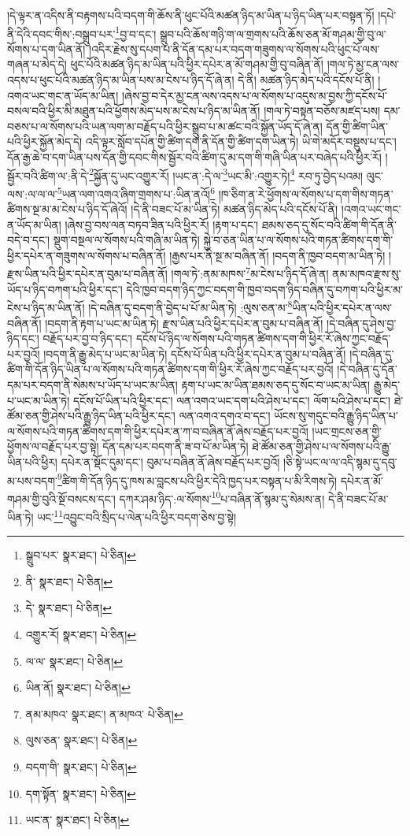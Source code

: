 །དེ་ལྟར་ན་འདིས་ནི་བརྟགས་པའི་བདག་གི་ཆོས་ནི་ཕུང་པོའི་མཚན་ཉིད་མ་ཡིན་པ་ཉིད་ཡིན་པར་བསྟན་ཏོ། །དཔེ་ནི་དེའི་དབང་གིས་:བསྒྲུབ་པར་\footnote{སྒྲུབ་པར་  སྣར་ཐང་།  པེ་ཅིན། }བྱ་བ་དང་། སྒྲུབ་པའི་ཆོས་གཉི་ག་ལ་གྲགས་པའི་ཆོས་ཅན་མོ་གཤམ་གྱི་བུ་ལ་སོགས་པ་དག་ཡིན་ནོ། །འདིར་རྗེས་སུ་དཔག་པ་ནི་དོན་དམ་པར་བདག་གཟུགས་ལ་སོགས་པའི་ཕུང་པོ་ལས་གཞན་པ་མེད་དེ། ཕུང་པོའི་མཚན་ཉིད་མ་ཡིན་པའི་ཕྱིར་དཔེར་ན་མོ་གཤམ་གྱི་བུ་བཞིན་ནོ། །གལ་ཏེ་མྱ་ངན་ལས་འདས་པ་ཕུང་པོའི་མཚན་ཉིད་མ་ཡིན་པས་མ་ངེས་པ་ཉིད་དོ་ཞེ་ན། དེ་ནི། མཚན་ཉིད་མེད་པའི་དངོས་པོ་ནི། །འགའ་ཡང་གང་ན་ཡོད་མ་ཡིན། །ཞེས་བྱ་བ་དེར་མྱ་ངན་ལས་འདས་པ་ལ་སོགས་པ་འདུས་མ་བྱས་ཀྱི་དངོས་པོ་བསལ་བའི་ཕྱིར་མི་མཐུན་པའི་ཕྱོགས་མེད་པས་མ་ངེས་པ་ཉིད་མ་ཡིན་ནོ། །གལ་ཏེ་བསྟན་བཅོས་མཛད་པས། དམ་བཅས་པ་ལ་སོགས་པའི་ཡན་ལག་མ་བརྗོད་པའི་ཕྱིར་སྒྲུབ་པ་མ་ཚང་བའི་སྐྱོན་ཡོད་དོ་ཞེ་ན། དོན་གྱི་ཚིག་ཡིན་པའི་ཕྱིར་སྐྱོན་མེད་དེ། འདི་ལྟར་སློབ་དཔོན་གྱི་ཚིག་དག་ནི་དོན་གྱི་ཚིག་དག་ཡིན་ཏེ། ཡི་གེ་མདོར་བསྡུས་པ་དང་། དོན་རྒྱ་ཆེ་བ་དག་ཡིན་པས་དོན་གྱི་དབང་གིས་སྦྱོར་བའི་ཚིག་དུ་མ་དག་གི་གཞི་ཡིན་པར་བཞེད་པའི་ཕྱིར་རོ། །སྦྱོར་བའི་ཚིག་ལ་:ནི་དེ་\footnote{ནི་  སྣར་ཐང་།  པེ་ཅིན། }སྐྱོན་དུ་ཡང་འགྱུར་རོ། །ཡང་ན་:དེ་ལ་\footnote{དེ་  སྣར་ཐང་།  པེ་ཅིན། }ཡང་མི་:འགྱུར་ཏེ།\footnote{འགྱུར་རོ།  སྣར་ཐང་།  པེ་ཅིན། } རབ་ཏུ་བྱེད་པའམ། ལུང་ལས་:ལ་ལ་ལ་\footnote{ལ་ལ་  སྣར་ཐང་།  པེ་ཅིན། }ཡན་ལག་འགའ་ཞིག་གྲགས་པ་:ཡིན་ནའོ།\footnote{ཡིན་ནོ།  སྣར་ཐང་།  པེ་ཅིན། } །ཁ་ཅིག་ན་རེ་ཕྱོགས་ལ་སོགས་པ་དག་གིས་གཏན་ཚིགས་སྔ་མ་མ་ངེས་པ་ཉིད་དོ་ཞེའོ། །དེ་ནི་བཟང་པོ་མ་ཡིན་ཏེ། མཚན་ཉིད་མེད་པའི་དངོས་པོ་ནི། །འགའ་ཡང་གང་ན་ཡོད་མ་ཡིན། །ཞེས་བྱ་བས་ལན་བཏབ་ཟིན་པའི་ཕྱིར་རོ། །རྟག་པ་དང་། ཐམས་ཅད་དུ་སོང་བའི་ཚིག་གི་དོན་ནི་བདེ་བ་དང་། སྡུག་བསྔལ་ལ་སོགས་པའི་གཞི་མ་ཡིན་ཏེ། སྐྱེ་བ་ཅན་ཡིན་པ་ལ་སོགས་པའི་གཏན་ཚིགས་དག་གི་ཕྱིར་དཔེར་ན་གཟུགས་ལ་སོགས་པ་བཞིན་ནོ། །རྒྱས་པར་ནི་སྔ་མ་བཞིན་ནོ། །བདག་ནི་ཁྱབ་བདག་མ་ཡིན་ཏེ། །རྫས་ཡིན་པའི་ཕྱིར་དཔེར་ན་བུམ་པ་བཞིན་ནོ། །གལ་ཏེ་:ནམ་མཁས་\footnote{ནམ་མཁའ་  སྣར་ཐང་། ན་མཁའ་  པེ་ཅིན། }མ་ངེས་པ་ཉིད་དོ་ཞེ་ན། ནམ་མཁའ་རྫས་སུ་ཡོད་པ་ཉིད་བཀག་པའི་ཕྱིར་དང་། དེའི་ཁྱབ་བདག་ཉིད་ཀྱང་བདག་གི་ཁྱབ་བདག་ཉིད་བཞིན་དུ་བཀག་པའི་ཕྱིར་མ་ངེས་པ་ཉིད་མ་ཡིན་ནོ། །དེ་བཞིན་དུ་བདག་ནི་བྱེད་པ་པོ་མ་ཡིན་ཏེ། :ལུས་ཅན་མ་\footnote{ལུས་ཅན་  སྣར་ཐང་།  པེ་ཅིན། }ཡིན་པའི་ཕྱིར་དཔེར་ན་ལས་བཞིན་ནོ། །བདག་ནི་རྟག་པ་ཡང་མ་ཡིན་ཏེ། རྫས་ཡིན་པའི་ཕྱིར་དཔེར་ན་བུམ་པ་བཞིན་ནོ། །དེ་བཞིན་དུ་ཤེས་བྱ་ཉིད་དང་། བརྗོད་པར་བྱ་བ་ཉིད་དང་། དངོས་པོ་ཉིད་ལ་སོགས་པའི་གཏན་ཚིགས་དག་གི་ཕྱིར་རོ་ཞེས་ཀྱང་བརྗོད་པར་བྱའོ། །བདག་ནི་རྒྱུ་མེད་པ་ཡང་མ་ཡིན་ཏེ། དངོས་པོ་ཡིན་པའི་ཕྱིར་དཔེར་ན་བུམ་པ་བཞིན་ནོ། །དེ་བཞིན་དུ་ཚིག་གི་དོན་ཉིད་ཡིན་པ་ལ་སོགས་པའི་གཏན་ཚིགས་དག་གི་ཕྱིར་རོ་ཞེས་ཀྱང་བརྗོད་པར་བྱའོ། །དེ་བཞིན་དུ་དོན་དམ་པར་བདག་ནི་སེམས་པ་ཡོད་པ་ཡང་མ་ཡིན། རྟག་པ་ཡང་མ་ཡིན་ཐམས་ཅད་དུ་སོང་བ་ཡང་མ་ཡིན། རྒྱུ་མེད་པ་ཡང་མ་ཡིན་ཏེ། དངོས་པོ་ཡིན་པའི་ཕྱིར་དང་། ལན་འགའ་ཡང་དག་པའི་ཤེས་པ་དང་། ལོག་པའི་ཤེས་པ་དང་། ཐེ་ཚོམ་ཅན་གྱི་ཤེས་པའི་རྒྱུ་ཉིད་ཡིན་པའི་ཕྱིར་དང་། ལན་འགའ་དགའ་བ་དང་། ཡོངས་སུ་གདུང་བའི་རྒྱུ་ཉིད་ཡིན་པ་ལ་སོགས་པའི་གཏན་ཚིགས་དག་གི་ཕྱིར་དཔེར་ན་ཀ་བ་བཞིན་ནོ་ཞེས་བརྗོད་པར་བྱའོ། །ཡང་གྲངས་ཅན་གྱི་ཕྱོགས་ལ་བརྗོད་པར་བྱ་སྟེ། དོན་དམ་པར་བདག་ནི་ཟ་བ་པོ་མ་ཡིན་ཏེ། ཐེ་ཚོམ་ཅན་གྱི་ཤེས་པ་ལ་སོགས་པའི་རྒྱུ་ཡིན་པའི་ཕྱིར། དཔེར་ན་སྡོང་དུམ་དང་། བུམ་པ་བཞིན་ནོ་ཞེས་བརྗོད་པར་བྱའོ། །ཅི་སྟེ་ཡང་ལ་ལ་འདི་སྙམ་དུ་དབུ་མ་པས་བདག་\footnote{བདག་གི་  སྣར་ཐང་།  པེ་ཅིན། }ཚིག་གི་དོན་ཉིད་དུ་ཁས་མ་བླངས་པའི་ཕྱིར་དེའི་ཁྱད་པར་བསྟན་པ་མི་རིགས་ཏེ། དཔེར་ན་མོ་གཤམ་གྱི་བུའི་སྔོ་བསངས་དང་། དཀར་ཤམ་ཉིད་:ལ་སོགས་\footnote{དག་སྟོན་  སྣར་ཐང་།  པེ་ཅིན། }པ་བཞིན་ནོ་སྙམ་དུ་སེམས་ན། དེ་ནི་བཟང་པོ་མ་ཡིན་ཏེ། ཡང་\footnote{ཡང་ན་  སྣར་ཐང་།  པེ་ཅིན། }འབྱུང་བའི་སྲིད་པ་ལེན་པའི་ཕྱིར་བདག་ཅེས་བྱ་སྟེ། 